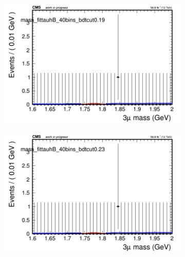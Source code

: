 \begin{figure}[H]
\begin{subfigure}{0.2\textwidth}
        \caption{}
    \end{subfigure}
    \begin{subfigure}{0.2\textwidth}
        \includegraphics[width=\textwidth]{power_law/plots/tauhB/massfit_tauhB_40bins_bdtcut0.19.png}
        \caption{}
    \end{subfigure}
    \begin{subfigure}{0.2\textwidth}
        \includegraphics[width=\textwidth]{power_law/plots/tauhB/massfit_tauhB_40bins_bdtcut0.23.png}
        \caption{}
    \end{subfigure}
    \begin{subfigure}{0.2\textwidth}

\end{subfigure}
\end{figure}
